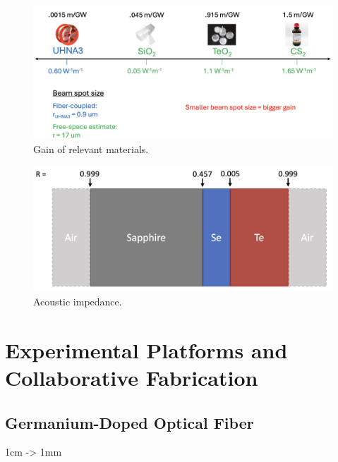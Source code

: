 \begin{figure}[t]
  \centering
  \includegraphics[width=\textwidth]{figs/4-Raman/GainOfRelevantMaterials.png}
  \caption{Gain of relevant materials.}
  \label{fig:Raman:GainOfRelevantMaterials}
\end{figure}

\begin{figure}[t]
  \centering
  \includegraphics[width=\textwidth]{figs/4-Raman/AcousticImpedance.png}
  \caption{Acoustic impedance.}
  \label{fig:Raman:AcousticImpedance}
\end{figure}


\section{Experimental Platforms and Collaborative Fabrication}
\label{sec:Raman:ExperimentalPlatformsandCollaborativeFabrication}

\subsection{Germanium-Doped Optical Fiber}
\label{subsec:Raman:Target:UHNA3}

1cm -> 1mm

